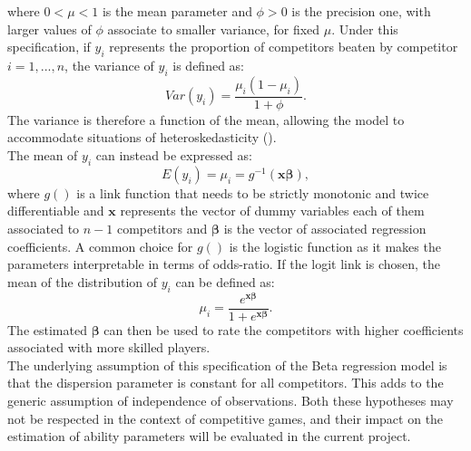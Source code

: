 where $0<\mu<1$  is the mean parameter and $\phi>0$ is the precision one, with larger values of $\phi$ associate to smaller variance, for fixed $\mu$.
Under this specification, if $y_{i}$ represents the proportion of competitors beaten by competitor $i=1,...,n$, the variance of $y_{i}$ is defined as:
\begin{equation*}
{Var}(y_{i}) = \frac{\mu_i(1 - \mu_i)}{1 + \phi}.
\end{equation*}
The variance is therefore a function of the mean, allowing the model to accommodate situations of heteroskedasticity (\cite{cribari2010beta}).\\
The mean of  $y_{i}$ can instead be expressed as:
\begin{equation*}
E(y_{i})=\mu_{i}=g^{-1}(\boldsymbol{x}\boldsymbol{\beta}),
\end{equation*}
where $g()$ is a link function that needs to be strictly monotonic and twice differentiable and $\boldsymbol{x}$ represents the vector of dummy variables each of them associated to $n-1$ competitors and $\boldsymbol{\beta}$ is the vector of associated regression coefficients. A common choice for $g()$ is the logistic function as it makes the parameters interpretable in terms of odds-ratio. If the logit link is chosen, the mean of the distribution of $y_{i}$ can be defined as:
\begin{equation*}
\mu_{i}=\frac{e^{\boldsymbol{x}\boldsymbol{\beta}}}{1 + e^{\boldsymbol{x}\boldsymbol{\beta}}}
.
\end{equation*}
The estimated $\boldsymbol{\beta}$ can then be used to rate the competitors with higher coefficients associated with more skilled players.\\
The underlying assumption of this specification of the Beta regression model is that the dispersion parameter is constant for all competitors. This adds to the generic assumption of independence of observations. Both these hypotheses may not be respected in the context of competitive games, and their impact on the  estimation of ability parameters will be evaluated in the current  project.